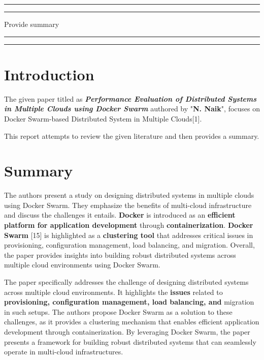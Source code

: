 
\newpage

\begin{flushright}
    \vspace{10cm}
    \rule{18cm}{5pt}
    \rule{18cm}{2pt}\vskip1cm
    \begin{center}
    \begin{bfseries}
        \Huge{Provide summary}\\
    \end{bfseries}
    \end{center}
    \vspace{1cm}
    \rule{18cm}{2pt}
    \rule{18cm}{5pt}
\end{flushright}
\clearpage
\chapter{Introduction}

The given paper titled as \textit{\textbf{Performance Evaluation of Distributed Systems in Multiple Clouds using Docker Swarm}} authored by "\textbf{N. Naik}", focuses on Docker Swarm-based Distributed System in Multiple Clouds[1].
\newline

This report attempts to review the given literature and then provides a summary.
\let\clearpage\relax

\chapter{Summary}
\label{chp:2}
The authors present a study on designing distributed systems in multiple clouds using Docker Swarm. They emphasize the benefits of multi-cloud infrastructure and discuss the challenges it entails. \textbf{Docker} is introduced as an \textbf{efficient platform for application development} through \textbf{containerization}. \textbf{Docker Swarm} [15] is highlighted as a \textbf{clustering tool} that addresses critical issues in provisioning, configuration management, load balancing, and migration. Overall, the paper provides insights into building robust distributed systems across multiple cloud environments using Docker Swarm.
\newline

The paper specifically addresses the challenge of designing distributed systems across multiple cloud environments. It highlights the \textbf{issues} related to \textbf{provisioning, configuration management, load balancing, and} migration in such setups. The authors propose Docker Swarm as a solution to these challenges, as it provides a clustering mechanism that enables efficient application development through containerization. By leveraging Docker Swarm, the paper presents a framework for building robust distributed systems that can seamlessly operate in multi-cloud infrastructures.
\newline

